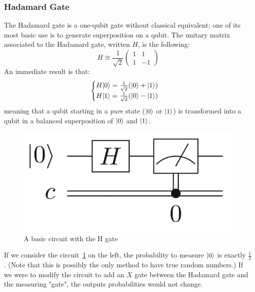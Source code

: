 \documentclass[12pt,a4paper]{article}
\theoremstyle{plain}
\theoremstyle{definition}
\DeclarePairedDelimiter\ket{\lvert}{\rangle}
\begin{document}
\subsubsection{Hadamard Gate}
The Hadamard gate is a one-qubit gate without classical equivalent; one of its most basic use is to generate superposition on a qubit. The unitary matrix associated to the Hadamard gate, written $H$, is the following:
\begin{equation*}
    H \cong \frac{1}{\sqrt{2}}
    \begin{pmatrix}
        1&1\\
        1&-1
    \end{pmatrix}
\end{equation*}
An immediate result is that:
\begin{equation*}
    \begin{cases}
        H\ket{0} = \frac{1}{\sqrt{2}}(\ket{0}+\ket{1}) \\
        H\ket{1} = \frac{1}{\sqrt{2}}(\ket{0}-\ket{1})
    \end{cases}
\end{equation*}
meaning that a qubit starting in a \emph{pure} state ($\ket{0}$ or $\ket{1}$) is transformed into a qubit in a balanced superposition of $\ket{0}$ and $\ket{1}$.

\begin{figure}
    \label{fig:basic-circuit}
    \centering
    \includegraphics*[scale=0.3]{basic-circuit.png}
    \caption{A basic circuit with the H gate}
\end{figure}

If we consider the circuit \ref{fig:basic-circuit} on the left, the probability to measure $\ket{0}$ is exactly $\frac{1}{2}$. (Note that this is possibly the only method to have true random numbers.) If we were to modify the circuit to add an $X$ gate between the Hadamard gate and the measuring "gate", the outputs probabilities would not change. 
\end{document}
